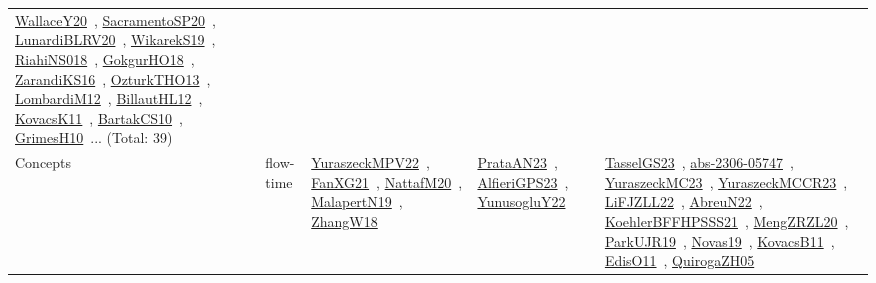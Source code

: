 {\begin{longtable}{lp{3cm}>{\raggedright\arraybackslash}p{6cm}>{\raggedright\arraybackslash}p{6cm}>{\raggedright\arraybackslash}p{8cm}}
\href{works/WallaceY20.pdf}{WallaceY20}~\cite{WallaceY20}, \href{works/SacramentoSP20.pdf}{SacramentoSP20}~\cite{SacramentoSP20}, \href{works/LunardiBLRV20.pdf}{LunardiBLRV20}~\cite{LunardiBLRV20}, \href{works/WikarekS19.pdf}{WikarekS19}~\cite{WikarekS19}, \href{works/RiahiNS018.pdf}{RiahiNS018}~\cite{RiahiNS018}, \href{works/GokgurHO18.pdf}{GokgurHO18}~\cite{GokgurHO18}, \href{works/ZarandiKS16.pdf}{ZarandiKS16}~\cite{ZarandiKS16}, \href{works/OzturkTHO13.pdf}{OzturkTHO13}~\cite{OzturkTHO13}, \href{works/LombardiM12.pdf}{LombardiM12}~\cite{LombardiM12}, \href{works/BillautHL12.pdf}{BillautHL12}~\cite{BillautHL12}, \href{works/KovacsK11.pdf}{KovacsK11}~\cite{KovacsK11}, \href{works/BartakCS10.pdf}{BartakCS10}~\cite{BartakCS10}, \href{works/GrimesH10.pdf}{GrimesH10}~\cite{GrimesH10}... (Total: 39)\\
Concepts & flow-time & \href{works/YuraszeckMPV22.pdf}{YuraszeckMPV22}~\cite{YuraszeckMPV22}, \href{works/FanXG21.pdf}{FanXG21}~\cite{FanXG21}, \href{works/NattafM20.pdf}{NattafM20}~\cite{NattafM20}, \href{works/MalapertN19.pdf}{MalapertN19}~\cite{MalapertN19}, \href{works/ZhangW18.pdf}{ZhangW18}~\cite{ZhangW18} & \href{works/PrataAN23.pdf}{PrataAN23}~\cite{PrataAN23}, \href{works/AlfieriGPS23.pdf}{AlfieriGPS23}~\cite{AlfieriGPS23}, \href{works/YunusogluY22.pdf}{YunusogluY22}~\cite{YunusogluY22} & \href{works/TasselGS23.pdf}{TasselGS23}~\cite{TasselGS23}, \href{works/abs-2306-05747.pdf}{abs-2306-05747}~\cite{abs-2306-05747}, \href{works/YuraszeckMC23.pdf}{YuraszeckMC23}~\cite{YuraszeckMC23}, \href{works/YuraszeckMCCR23.pdf}{YuraszeckMCCR23}~\cite{YuraszeckMCCR23}, \href{works/LiFJZLL22.pdf}{LiFJZLL22}~\cite{LiFJZLL22}, \href{works/AbreuN22.pdf}{AbreuN22}~\cite{AbreuN22}, \href{works/KoehlerBFFHPSSS21.pdf}{KoehlerBFFHPSSS21}~\cite{KoehlerBFFHPSSS21}, \href{works/MengZRZL20.pdf}{MengZRZL20}~\cite{MengZRZL20}, \href{works/ParkUJR19.pdf}{ParkUJR19}~\cite{ParkUJR19}, \href{works/Novas19.pdf}{Novas19}~\cite{Novas19}, \href{works/KovacsB11.pdf}{KovacsB11}~\cite{KovacsB11}, \href{works/EdisO11.pdf}{EdisO11}~\cite{EdisO11}, \href{works/QuirogaZH05.pdf}{QuirogaZH05}~\cite{QuirogaZH05}\\

\end{longtable}}
